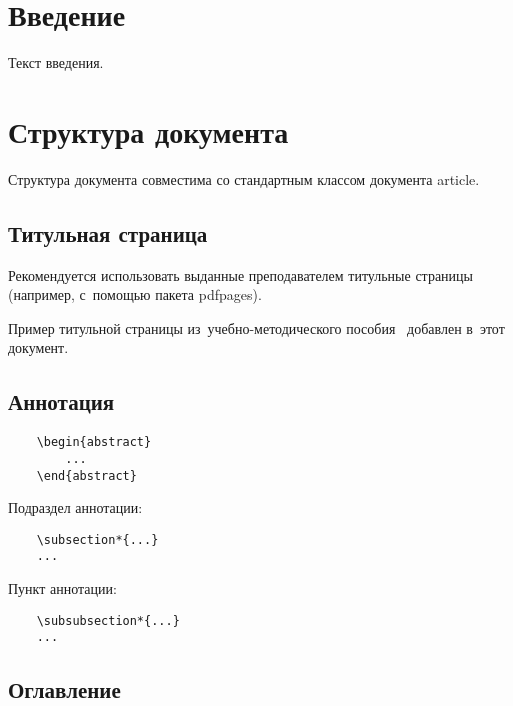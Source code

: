 \documentclass{mirea-prog-lang}
\begin{document}
\tableofcontents

\section*{Введение}
{}

Текст введения.

\section{Структура документа}

Структура документа совместима со стандартным классом документа article.

\subsection{Титульная страница}

Рекомендуется использовать выданные преподавателем титульные страницы (например, с~помощью пакета pdfpages).

Пример титульной страницы из~у\-чеб\-но-ме\-то\-ди\-чес\-ко\-го пособия~\cite{bib:recomendations} добавлен в~этот документ.

\subsection{Аннотация}

\begin{verbatim}
	\begin{abstract}
		...
	\end{abstract}
\end{verbatim}

Подраздел аннотации:
\begin{verbatim}
	\subsection*{...}
	...
\end{verbatim}

Пункт аннотации:
\begin{verbatim}
	\subsubsection*{...}
	...
\end{verbatim}

\subsection{Оглавление}
\end{document}
